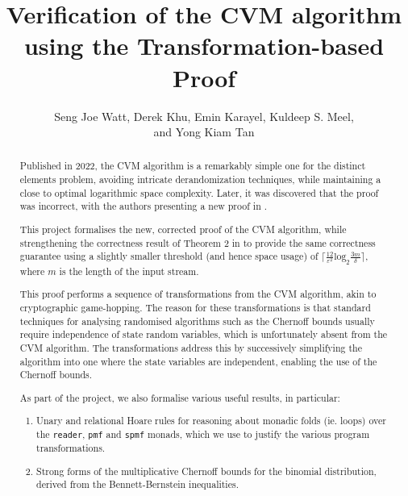 \documentclass[11pt, a4paper]{report}
\begin{document}
\title{Verification of the CVM algorithm using the Transformation-based Proof}

\author{
  Seng Joe Watt,
  Derek Khu,
  Emin Karayel,
  Kuldeep S. Meel,
  \\
  and Yong Kiam Tan
}

\maketitle

\begin{abstract}
  Published in 2022, the CVM algorithm \cite{cvm_2022} is a remarkably simple
  one for the distinct elements problem, avoiding intricate derandomization
  techniques, while maintaining a close to optimal logarithmic space complexity.
  Later, it was discovered that the proof was incorrect, with the authors
  presenting a new proof in \cite{cvm_2023}.

  This project formalises the new, corrected proof of the CVM algorithm, while
  strengthening the correctness result of Theorem 2 in \cite{cvm_2023} to provide
  the same correctness guarantee using a slightly smaller threshold
  (and hence space usage) of
  $\lceil \frac{12}{\varepsilon^2} \text{log}_2 \frac{3m}{\delta} \rceil$,
  where $m$ is the length of the input stream.

  This proof performs a sequence of transformations from the CVM algorithm,
  akin to cryptographic game-hopping.  The reason for these transformations is
  that standard techniques for analysing randomised algorithms such as the
  Chernoff bounds usually require independence of state random variables, which
  is unfortunately absent from the CVM algorithm.  The transformations address
  this by successively simplifying the algorithm into one where the state
  variables are independent, enabling the use of the Chernoff bounds.

  As part of the project, we also formalise various useful results, in particular:
  \begin{enumerate}
    \item Unary and relational Hoare rules for reasoning about monadic folds
    (ie. loops) over the \texttt{reader}, \texttt{pmf} and \texttt{spmf} monads,
    which we use to justify the various program transformations.

    \item Strong forms of the multiplicative Chernoff bounds for the binomial
    distribution, derived from the Bennett-Bernstein inequalities.
  \end{enumerate}
\end{abstract}
\end{document}

